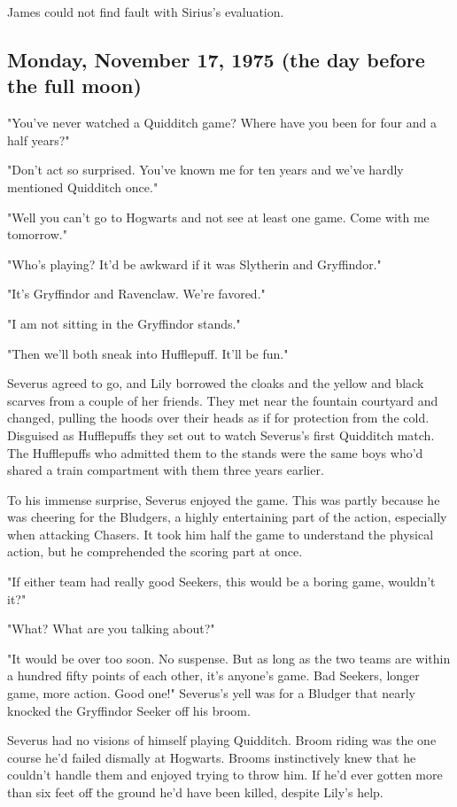 \documentclass[a4paper,11pt]{article}
\begin{document}
James could not find fault with Sirius's evaluation.

\subsection{Monday, November 17, 1975 (the day before the full moon)}

"You've never watched a Quidditch game? Where have you been for four and a half years?"

"Don't act so surprised. You've known me for ten years and we've hardly mentioned Quidditch once."

"Well you can't go to Hogwarts and not see at least one game. Come with me tomorrow."

"Who's playing? It'd be awkward if it was Slytherin and Gryffindor."

"It's Gryffindor and Ravenclaw. We're favored."

"I am not sitting in the Gryffindor stands."

"Then we'll both sneak into Hufflepuff. It'll be fun."

Severus agreed to go, and Lily borrowed the cloaks and the yellow and black scarves from a couple of her friends. They met near the fountain courtyard and changed, pulling the hoods over their heads as if for protection from the cold. Disguised as Hufflepuffs they set out to watch Severus's first Quidditch match. The Hufflepuffs who admitted them to the stands were the same boys who'd shared a train compartment with them three years earlier.

To his immense surprise, Severus enjoyed the game. This was partly because he was cheering for the Bludgers, a highly entertaining part of the action, especially when attacking Chasers. It took him half the game to understand the physical action, but he comprehended the scoring part at once.

"If either team had really good Seekers, this would be a boring game, wouldn't it?"

"What? What are you talking about?"

"It would be over too soon. No suspense. But as long as the two teams are within a hundred fifty points of each other, it's anyone's game. Bad Seekers, longer game, more action. Good one!" Severus's yell was for a Bludger that nearly knocked the Gryffindor Seeker off his broom.

Severus had no visions of himself playing Quidditch. Broom riding was the one course he'd failed dismally at Hogwarts. Brooms instinctively knew that he couldn't handle them and enjoyed trying to throw him. If he'd ever gotten more than six feet off the ground he'd have been killed, despite Lily's help.
\end{document}
